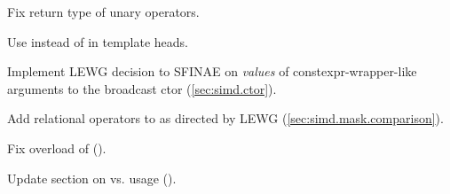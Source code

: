 \begin{revision}
\item Fix return type of \mask unary operators.
\item Use  instead of  in template heads.
\item Implement LEWG decision to SFINAE on \emph{values} of
  constexpr-wrapper-like arguments to the broadcast ctor (\ref{sec:simd.ctor}).
\item Add relational operators to \mask as directed by LEWG (\ref{sec:simd.mask.comparison}).
\item Fix  overload of \simdselect ().
\item Update section on  vs.  usage ().
\end{revision}

